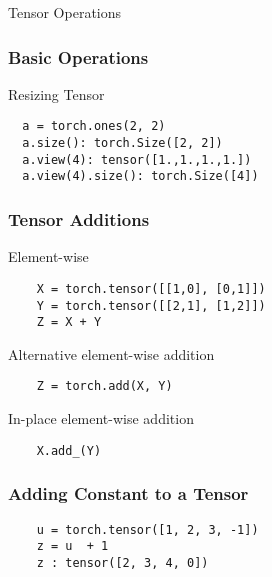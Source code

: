 \documentclass[14 pt]{beamer}
\begin{document}
\begin{frame}
  \begin{center}
    \Large{Tensor Operations}
  \end{center}
\end{frame}

\begin{frame}[fragile]
  \frametitle{Basic Operations}
  \begin{block}{Resizing Tensor}
\begin{verbatim}
  a = torch.ones(2, 2)
  a.size(): torch.Size([2, 2])
  a.view(4): tensor([1.,1.,1.,1.])
  a.view(4).size(): torch.Size([4])
\end{verbatim}
  \end{block}
\end{frame}
\begin{frame}[fragile]
  \frametitle{Tensor Additions}
  \begin{block}{Element-wise}
\begin{verbatim}
    X = torch.tensor([[1,0], [0,1]]) 
    Y = torch.tensor([[2,1], [1,2]]) 
    Z = X + Y 
\end{verbatim}
  \end{block}
  \begin{block}{Alternative element-wise addition}
\begin{verbatim}
    Z = torch.add(X, Y)
\end{verbatim}
  \end{block}
  \begin{block}{In-place element-wise addition}
\begin{verbatim}
    X.add_(Y) 
\end{verbatim}
  \end{block}
\end{frame}

\begin{frame}[fragile]
  \frametitle{Adding Constant to a Tensor}
  \begin{block}{}
\begin{verbatim}
    u = torch.tensor([1, 2, 3, -1]) 
    z = u  + 1 
    z : tensor([2, 3, 4, 0])
\end{verbatim}
  \end{block}
\end{frame}
\end{document}
